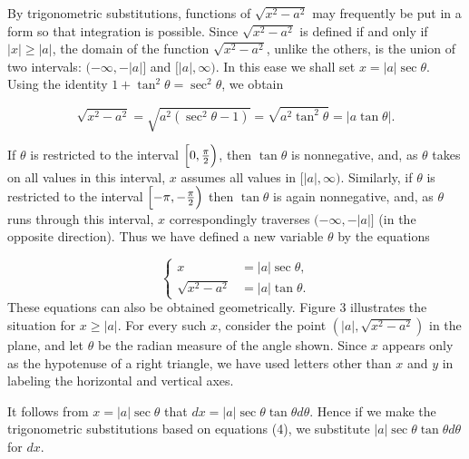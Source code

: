 By trigonometric substitutions, functions of $\sqrt{x^2 -a^2}$ may frequently be put in a 
form so that integration is possible. Since $\sqrt{x^2 - a^2}$ is defined if and only if $|x| \geq |a|$, the domain of the function $\sqrt{x^2 - a^2}$, unlike the others, is the union of two intervals: $(-\infty, -|a|]$ and $[|a|, \infty)$. In this ease we shall set $x = |a| \sec \theta$. Using the identity $1 + \tan^{2}\theta = \sec^{2} \theta$, we obtain

$$
\sqrt{x^2 - a^2} = \sqrt {a^{2}(\sec^{2} \theta - 1)}
= \sqrt{a^{2} \tan^{2} \theta} = | a \tan \theta |.
$$

\noindent If $\theta$ is restricted to the interval $\Bigl[0, \frac{\pi}{2}\Bigr)$, 
then $\tan \theta$ is nonnegative, and, as $\theta$ takes on all values
in this interval, $x$ assumes all values in $[|a|, \infty)$. Similarly, if $\theta$ is restricted to the interval $\Bigl[-\pi, -\frac{\pi}{2}\Bigr)$ then $\tan \theta$ is again nonnegative, and, as $\theta$ runs through this interval, $x$ correspondingly traverses $(-\infty,-|a|]$ (in the opposite direction). Thus we have defined a new variable $\theta$ by the equations


\begin{equation}
\left \{
\begin{array}{rl}
                      x &= |a| \sec \theta, \\
\sqrt{x^2 - a^2} &= |a| \tan \theta.
\end{array}
\right. 
\label{eq7.3.4}
\end{equation}
\noindent These equations can also be obtained geometrically. Figure 3 illustrates the situation for $x \geq |a|$. For every such $x$, consider the point $(|a|, \sqrt{x^2 - a^2})$ in the plane, and let $\theta$ be the radian measure of the angle shown. Since $x$ appears only as the hypotenuse of a right triangle, we have used letters other than $x$ and $y$ in labeling the horizontal and vertical axes.


It follows from $x = |a| \sec \theta$ that $dx = |a| \sec \theta \tan \theta d\theta$. Hence if we make the trigonometric substitutions based on equations (4), we substitute $|a| \sec \theta \tan \theta d\theta$ for $dx$.

